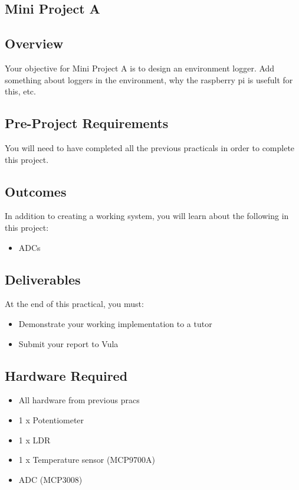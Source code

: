 \subsection{Mini Project A}
\label{sec:ProjA}

\subsection{Overview}
Your objective for Mini Project A is to design an environment logger. Add something about loggers in the environment, why the raspberry pi is usefult for this, etc.

\subsection{Pre-Project Requirements}
You will need to have completed all the previous practicals in order to complete this project.

\subsection{Outcomes}
In addition to creating a working system, you will learn about the following in this project:
\begin{itemize}
    \item ADCs
\end{itemize}

\subsection{Deliverables}
At the end of this practical, you must:
\begin{itemize}
    \item Demonstrate your working implementation to a tutor
    \item Submit your report to Vula
\end{itemize}

\subsection{Hardware Required}
\begin{itemize}
    \item All hardware from previous pracs
    \item 1 x Potentiometer
    \item 1 x LDR
    \item 1 x Temperature sensor (MCP9700A)
    \item ADC (MCP3008)
\end{itemize}


